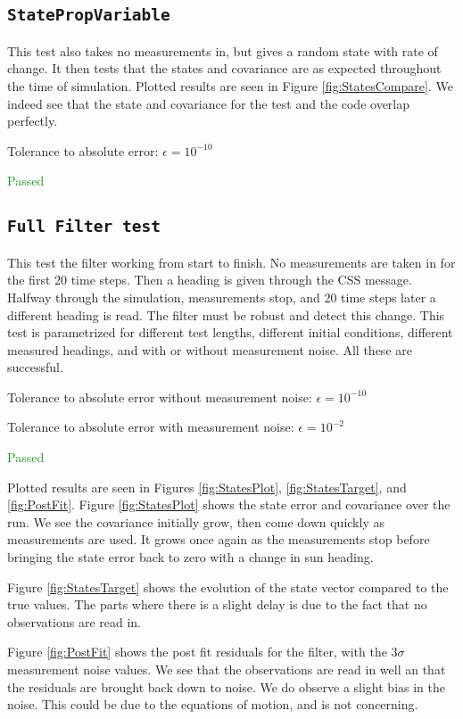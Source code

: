 \documentclass[]{BasiliskReportMemo}
\begin{document}


\subsection{\texttt{StatePropVariable}}

This test also takes no measurements in, but gives a random state with rate of change. It then tests that the states and covariance are as expected throughout the time of simulation. Plotted results are seen in Figure \ref{fig:StatesCompare}. We indeed see that the state and covariance for the test and the code overlap perfectly.

Tolerance to absolute error: $\epsilon = 10^{-10}$

\textcolor{ForestGreen}{Passed}


\subsection{\texttt{Full Filter test}}

This test the filter working from start to finish. No measurements are taken in for the first 20 time steps. Then a heading is given through the CSS message. Halfway through the simulation, measurements stop, and 20 time steps later a different heading is read. The filter must be robust and detect this change. This test is parametrized for different test lengths, different initial conditions, different measured headings, and with or without measurement noise. All these are successful.

\vspace{0.2cm}
Tolerance to absolute error without measurement noise: $\epsilon = 10^{-10}$

Tolerance to absolute error with measurement noise: $\epsilon = 10^{-2}$

\textcolor{ForestGreen}{Passed}

Plotted results are seen in Figures \ref{fig:StatesPlot}, \ref{fig:StatesTarget}, and \ref{fig:PostFit}. Figure \ref{fig:StatesPlot} shows the state error and covariance over the run. We see the covariance initially grow, then come down quickly as measurements are used. It grows once again as the measurements stop before bringing the state error back to zero with a change in sun heading. 

Figure \ref{fig:StatesTarget} shows the evolution of the state vector compared to the true values. The parts where there is a slight delay is due to the fact that no observations are read in. 

Figure \ref{fig:PostFit} shows the post fit residuals for the filter, with the $3\sigma$ measurement noise values. We see that the observations are read in well an that the residuals are brought back down to noise. We do observe a slight bias in the noise. This could be due to the equations of motion, and is not concerning.





\end{document}
